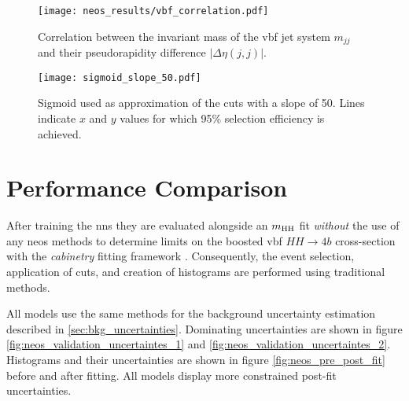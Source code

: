 \begin{figure}
    \centering
    \texttt{[image: neos\_results/vbf\_correlation.pdf]}
    \caption[]{Correlation between the invariant mass of the \ac{vbf} jet system $m_{jj}$ and their pseudorapidity difference $|\Delta\eta(j,j)|$.}
    \label{fig:vbf_correlation}
\end{figure}

\begin{figure}
    \centering
    \texttt{[image: sigmoid\_slope\_50.pdf]}
    \caption[]{Sigmoid used as approximation of the cuts with a slope of 50. Lines indicate $x$ and $y$ values for which 95\% selection efficiency is achieved.}
    \label{fig:sigmoid_slope_50}
\end{figure}





\section{Performance Comparison}
After training the \acp{nn} they are evaluated alongside an $m_\text{HH}$ fit \textit{without} the use of any \ac{neos} methods to determine limits on the boosted \ac{vbf} $HH\rightarrow4b$ cross-section with the \textit{cabinetry} fitting framework \citep{cranmer_2021_4627038}. Consequently, the event selection, application of cuts, and creation of histograms are performed using traditional methods.

All models use the same methods for the background uncertainty estimation described in \ref{sec:bkg_uncertainties}. Dominating uncertainties are shown in figure \ref{fig:neos_validation_uncertaintes_1} and \ref{fig:neos_validation_uncertaintes_2}. Histograms and their uncertainties are shown in figure \ref{fig:neos_pre_post_fit} before and after fitting. All models display more constrained post-fit uncertainties.

